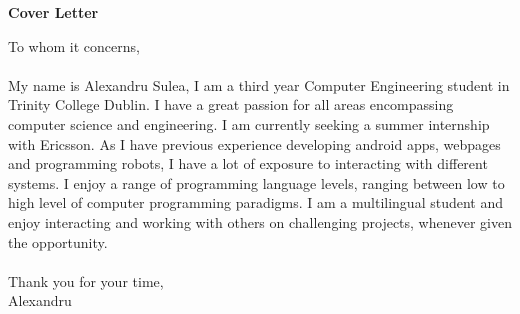 \documentclass{article}
\begin{document}
\begin{titlepage}
	\begin{center}
	\huge{\bfseries Cover Letter}\\	
	[0mm]
	
	\end{center}
	






		
		
		
\vspace*{2cm}
		
		
		
\noindent To whom it concerns,\\
\\
	My name is Alexandru Sulea, I am a third year Computer Engineering student in Trinity College Dublin. I have a great passion for all areas encompassing computer science and engineering. I am currently seeking a summer internship with Ericsson. As I have previous experience developing android apps, webpages and programming robots, I have a lot of exposure to interacting with different systems. I enjoy a range of programming language levels, ranging between low to high level of computer programming paradigms. I am a multilingual student and enjoy interacting and working with others on challenging projects, whenever given the opportunity.\\
\\
Thank you for your time,\\
Alexandru\\

\end{titlepage}
\end{document}
